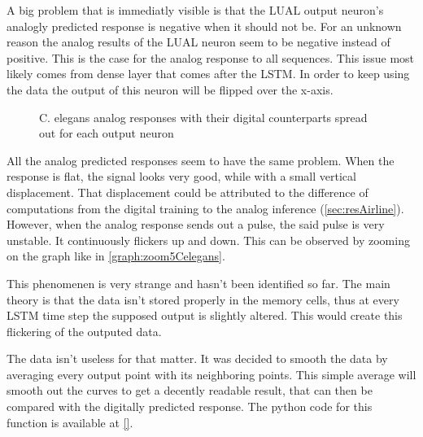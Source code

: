 A big problem that is immediatly visible is that the LUAL output neuron's analogly predicted response is negative when it should not be. For an unknown reason the analog results of the LUAL neuron seem to be negative instead of positive. This is the case for the analog response to all sequences. This issue most likely comes from dense layer that comes after the \ac{LSTM}. In order to keep using the data the output of this neuron will be flipped over the x-axis.


\begin{figure}[H]
  \centering
  \begin{minipage}{\columnwidth}
    \hfill
  \end{minipage}
  \begin{minipage}{\columnwidth}
    \hfill
  \end{minipage}
  \caption{\ac{C. elegans} analog responses with their digital counterparts spread out for each output neuron}
  \label{graph:spread5Celegans}
\end{figure}

All the analog predicted responses seem to have the same problem. When the response is flat, the signal looks very good, while with a small vertical displacement. That displacement could be attributed to the difference of computations from the digital training to the analog inference (\cref{sec:resAirline}). However, when the analog response sends out a pulse, the said pulse is very unstable. It continuously flickers up and down. This can be observed by zooming on the graph like in \cref{graph:zoom5Celegans}.

This phenomenen is very strange and hasn't been identified so far. The main theory is that the data isn't stored properly in the memory cells, thus at every \ac{LSTM} time step the supposed output is slightly altered. This would create this flickering of the outputed data.

The data isn't useless for that matter. It was decided to smooth the data by averaging every output point with its neighboring points. This simple average will smooth out the curves to get a decently readable result, that can then be compared with the digitally predicted response. The python code for this function is available at \cref{}. %

